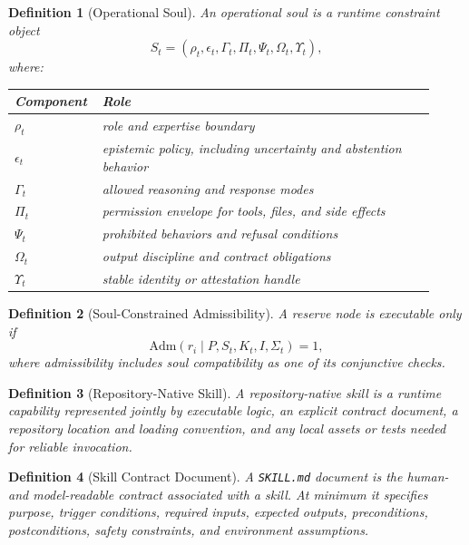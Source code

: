 \documentclass[11pt]{article}
\newtheorem{definition}{Definition}[section]
\theoremstyle{remark}
\newcommand{\Adm}{\mathrm{Adm}}
\begin{document}
\begin{definition}[Operational Soul]
An operational soul is a runtime constraint object
\[
S_t=(\rho_t,\epsilon_t,\Gamma_t,\Pi_t,\Psi_t,\Omega_t,\Upsilon_t),
\]
where:
\begin{center}
\small
\begin{tabular}{@{}p{0.16\linewidth}>{\raggedright\arraybackslash}p{0.76\linewidth}@{}}
\toprule
\textbf{Component} & \textbf{Role} \\
\midrule
\(\rho_t\) & role and expertise boundary \\
\(\epsilon_t\) & epistemic policy, including uncertainty and abstention behavior \\
\(\Gamma_t\) & allowed reasoning and response modes \\
\(\Pi_t\) & permission envelope for tools, files, and side effects \\
\(\Psi_t\) & prohibited behaviors and refusal conditions \\
\(\Omega_t\) & output discipline and contract obligations \\
\(\Upsilon_t\) & stable identity or attestation handle \\
\bottomrule
\end{tabular}
\end{center}
\end{definition}

\begin{definition}[Soul-Constrained Admissibility]
A reserve node is executable only if
\[
\Adm(r_i \mid P,S_t,K_t,I,\Sigma_t)=1,
\]
where admissibility includes soul compatibility as one of its conjunctive checks.
\end{definition}

\begin{definition}[Repository-Native Skill]
A repository-native skill is a runtime capability represented jointly by executable logic, an explicit contract document, a repository location and loading convention, and any local assets or tests needed for reliable invocation.
\end{definition}

\begin{definition}[Skill Contract Document]
A \texttt{SKILL.md} document is the human- and model-readable contract associated with a skill. At minimum it specifies purpose, trigger conditions, required inputs, expected outputs, preconditions, postconditions, safety constraints, and environment assumptions.
\end{definition}
\end{document}
